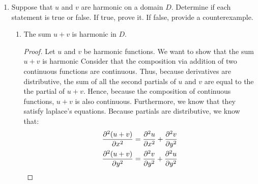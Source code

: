 \begin{enumerate}
\begin{enumerate}
\item $u = e^x \sin y$
\begin{problem}
	Now, we calculate the second order partials so we can check they are continuous:
	\begin{align*}
		\prt{^2e^x\sin y}{x^2} = e^x\sin y&,\quad \prt{^2e^x\sin y}{y^2} = -e^x\sin y\\
		\prt{^2e^x\sin y}{xy}=e^x\cos y&, \quad \prt{^2e^x\sin y}{yx} = e^x\cos y
	\end{align*}
	They are all continuous because they are the composition of two continuous funtions $e^x, \cos y, \sin y$. Now, we find the $v$ such that $u + iv$ is analytic. Consider the partials:
	\begin{align*}
		\prt{u}{x} = e^x\sin y &= \prt{v}{y}\\
		\prt{u}{y} = e^x\cos y &= -\prt{v}x
	\end{align*}
	Taking the integrals with respect to each equation gives:
	\begin{align*}
		\int e^x\sin y\,dy &= -e^x\cos y +C\\
		-\int e^x\sin y\, dx &= -e^x \cos y+C
	\end{align*}
	Thus, we have that $\boxed{v = -e^x\cos y + C}$. 
\end{problem}
\end{enumerate}

\item Suppose that $u$ and $v$ are harmonic on a domain $D$. Determine if each statement is true or false. If true, prove it. If false, provide a counterexample.
	\begin{enumerate}
		\item The sum $u+v$ is harmonic in $D$.
		\begin{proof}
			Let $u$ and $v$ be harmonic functions. We want to show that the sum $u+v$ is harmonic\gline{}
			Consider that the composition via addition of two continuous functions are continuous. Thus, because  derivatives are distributive, the sum of all the second partials of $u$ and $v$ are equal to the the partial of $u +v$. Hence, because the composition of continuous functions, $u+v$ is also continuous. \gline{}
			Furthermore, we know that they satisfy laplace's equations. Because partials are distributive, we know that:
			\begin{align*}
				\frac{\partial^2(u+v)}{\partial x^2} &= \frac{\partial^2u}{\partial x^2} + \frac{\partial^2v}{\partial y^2}\\
				\frac{\partial^2(u+v)}{\partial y^2} &= \frac{\partial^2v}{\partial y^2}+\frac{\partial^2u}{\partial y^2}
			\end{align*}
	

\end{proof}
\end{enumerate}
\end{enumerate}

